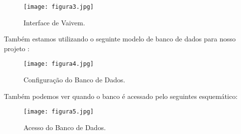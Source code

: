 \begin{figure}[!h]
	\centering
	\caption{Interface de Vaivem.}
	\texttt{[image: figura3.jpg]}
	\label{fig:Vaivem}
\end{figure}

Também estamos utilizando o seguinte modelo de banco de dados para nosso projeto :

\begin{figure}[!h]
	\centering
	\caption{Configuração do Banco de Dados.}
	\texttt{[image: figura4.jpg]}
	\label{fig:label_da_figura}
\end{figure}


Também podemos ver quando o banco é acessado pelo seguintes esquemático:

\begin{figure}[!h]
	\centering
	\caption{Acesso do Banco de Dados.}
	\texttt{[image: figura5.jpg]}
	\label{fig:label_da_figura}
\end{figure}
